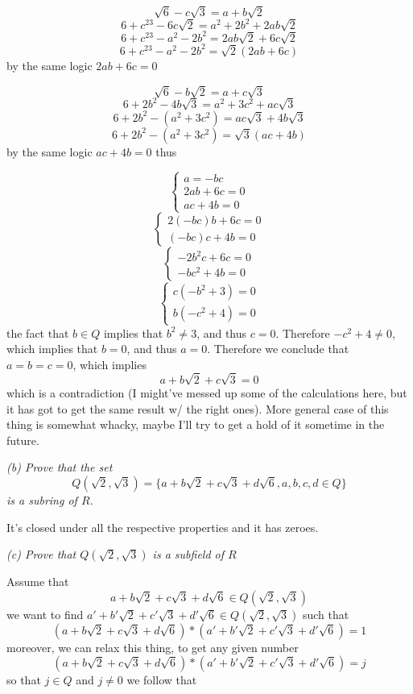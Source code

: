 \documentclass[11pt,oneside,titlepage]{book}
\newcommand{\set}[1]{\{ #1 \}}
\begin{document}
$$\sqrt{6} - c\sqrt{3}= a + b\sqrt{2} $$
$$6 + c^23 - 6c \sqrt{2}= a^2 + 2b^2 + 2ab\sqrt{2}$$
$$6 + c^23 - a^2 - 2b^2 =  2ab\sqrt{2} +  6c \sqrt{2}$$
$$6 + c^23 - a^2 - 2b^2 =  \sqrt{2}(2ab + 6c)$$
by the same logic $2ab + 6c = 0$

$$\sqrt{6} - b\sqrt{2}= a + c\sqrt{3} $$
$$6 + 2b^2 - 4b\sqrt{3}= a^2 + 3c^2 + ac\sqrt{3}$$
$$6 + 2b^2 - (a^2 + 3c^2) = ac\sqrt{3} + 4b\sqrt{3}$$
$$6 + 2b^2 - (a^2 + 3c^2) = \sqrt{3}(ac + 4b)$$
by the same logic $ac + 4b = 0$ thus

$$
\begin{cases} a = -bc \\ 2ab + 6c = 0 \\ ac + 4b = 0
\end{cases}
$$
$$
\begin{cases} 2(-bc)b + 6c = 0 \\ (-bc)c + 4b = 0
\end{cases}
$$
$$
\begin{cases} -2b^2c + 6c = 0 \\ -bc^2 + 4b = 0
\end{cases}
$$
$$
\begin{cases} c(-b^2 + 3) = 0 \\ b(-c^2 + 4) = 0
\end{cases}
$$
the fact that $b \in Q$ implies that $b^2 \neq 3$, and thus $c =
0$. Therefore $-c^2 + 4 \neq 0$, which implies that $b = 0$, and thus
$a = 0$. Therefore we conclude that $a = b = c = 0$, which implies
$$a + b\sqrt{2} + c\sqrt{3} = 0$$
which is a contradiction (I might've messed up some of the
calculations here, but it has got to get the same result w/ the right
ones). More general case of this thing is somewhat whacky, maybe I'll
try to get a hold of it sometime in the future.

\textit{(b) Prove that the set
  $$Q(\sqrt{2}, \sqrt{3}) = \set{a + b\sqrt{2} + c\sqrt{3} + d\sqrt{6}, a, b, c, d \in Q}$$
  is a subring of $R$.  }

It's closed under all the respective properties and it has zeroes.

\textit{(c) Prove that $Q(\sqrt{2}, \sqrt{3})$ is a subfield of $R$}

Assume that
$$a + b\sqrt{2} + c\sqrt{3} + d\sqrt{6} \in Q(\sqrt{2}, \sqrt{3})$$
we want to find $a' + b'\sqrt{2} + c'\sqrt{3} + d'\sqrt{6} \in
Q(\sqrt{2}, \sqrt{3})$ such that
$$ (a + b\sqrt{2} + c\sqrt{3} + d\sqrt{6}) * (a' + b'\sqrt{2} + c'\sqrt{3} + d'\sqrt{6}) = 1$$
moreover, we can relax this thing, to get any given number
$$ (a + b\sqrt{2} + c\sqrt{3} + d\sqrt{6}) * (a' + b'\sqrt{2} + c'\sqrt{3} + d'\sqrt{6}) = j$$
so that $j \in Q$ and $j \neq 0$ we follow that
\end{document}

